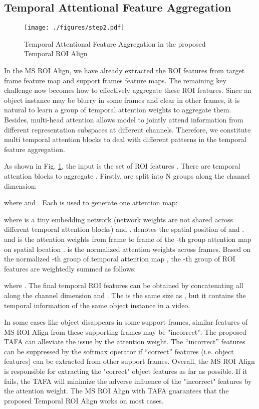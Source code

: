 \documentclass[letterpaper]{article} \usepackage{aaai21}  \usepackage{times}  \usepackage{helvet} \usepackage{courier}  \usepackage[hyphens]{url}  \usepackage{graphicx} \usepackage{hyperref}
\begin{document}
\subsection{Temporal Attentional Feature Aggregation}
\begin{figure}[t]
\centering
\texttt{[image: ./figures/step2.pdf]}
\caption{Temporal Attentional Feature Aggregation in the proposed Temporal ROI Align}
\label{fig:step2}
\vspace{-0.05cm}
\end{figure}

In the MS ROI Align, we have already extracted the ROI features from target frame feature map and support frames feature maps. The remaining key challenge now becomes how to effectively aggregate these ROI features. 
Since an object instance may be blurry in some frames and clear in other frames, it is natural to learn a group of temporal attention weights to aggregate them.
Besides, multi-head attention \cite{vaswani2017attention} allows model to jointly attend information from different representation subspaces at different channels. Therefore, we constitute multi temporal attention blocks to deal with different patterns in the temporal feature aggregation.


As shown in Fig. \ref{fig:step2}, the input is the set of ROI features . There are  temporal attention blocks to aggregate . Firstly,  are split into N groups along the channel dimension:

where  and . Each  is used to generate one attention map:


where  is a tiny embedding network (network weights are not shared across different temporal attention blocks) and .  denotes the spatial position of  and .  and  is the attention weights from  frame to  frame of the -th group attention map on spatial location .  is the normalized attention weights across frames. Based on the normalized -th group of temporal attention map , the -th group of ROI features  are weightedly summed as follows:

where . The final temporal ROI features  can be obtained by concatenating all  along the channel dimension and . The  is the same size as , but it contains the temporal information of the same object instance in a video.


In some cases like object disappears in some support frames, similar features of MS ROI Align from these supporting frames may be "incorrect". The proposed TAFA can alleviate the issue by the attention weight. 
The “incorrect” features can be suppressed by the softmax operator if “correct” features (i.e. object features) can be extracted from other support frames. Overall, the MS ROI Align is responsible for extracting the "correct" object features as far as possible. If it fails, the TAFA will minimize the adverse influence of the "incorrect" features by the attention weight. The MS ROI Align with TAFA guarantees that the proposed Temporal ROI Align works on most cases.
\end{document}
